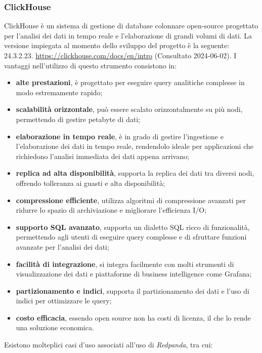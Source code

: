 \subsubsection{ClickHouse}
ClickHouse è un sistema di gestione di database colonnare open-source progettato per l'analisi dei dati in tempo reale e l'elaborazione di grandi volumi di dati.
La versione impiegata al momento dello sviluppo del progetto è la seguente: 24.3.2.23.
\url{https://clickhouse.com/docs/en/intro} (Consultato 2024-06-02).
I vantaggi nell'utilizzo di questo strumento consistono in:
\begin{itemize}
    \item \textbf{alte prestazioni}, è progettato per eseguire query analitiche complesse in modo estremamente rapido;
	\item \textbf{scalabilità orizzontale}, può essere scalato orizzontalmente su più nodi, permettendo di gestire petabyte di dati;
	\item \textbf{elaborazione in tempo reale}, è in grado di gestire l'ingestione e l'elaborazione dei dati in tempo reale, rendendolo ideale per applicazioni che richiedono l'analisi immediata dei dati appena arrivano;
	\item \textbf{replica ad alta disponibilità}, supporta la replica dei dati tra diversi nodi, offrendo tolleranza ai guasti e alta disponibilità;
	\item \textbf{compressione efficiente}, utilizza algoritmi di compressione avanzati per ridurre lo spazio di archiviazione e migliorare l'efficienza I/O;
	\item \textbf{supporto SQL avanzato}, supporta un dialetto SQL ricco di funzionalità, permettendo agli utenti di eseguire query complesse e di sfruttare funzioni avanzate per l'analisi dei dati;
	\item \textbf{facilità di integrazione}, si integra facilmente con molti strumenti di visualizzazione dei dati e piattaforme di business intelligence come Grafana;
	\item \textbf{partizionamento e indici}, supporta il partizionamento dei dati e l'uso di indici per ottimizzare le query;
	\item \textbf{costo efficacia}, essendo open source non ha costi di licenza, il che lo rende una soluzione economica.
\end{itemize}
Esistono molteplici casi d'uso associati all'uso di \textit{Redpanda}, tra cui:
